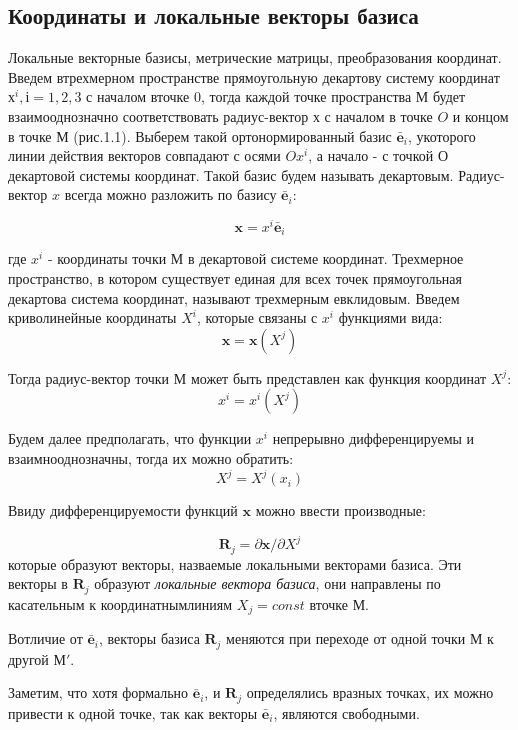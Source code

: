 

\subsection{ Координаты и локальные векторы базиса}
  Локальные векторные базисы, метрические матрицы, преобразования координат.
Введем втрехмерном пространстве прямоугольную декартову систему координат$х^i, і= 1, 2, 3$ с началом вточке 0, тогда каждой точке пространства $М$ будет взаимооднозначно соответствовать радиус-вектор $х$ с началом в точке $O$ и концом в точке $М$ (рис.1.1). Выберем такой ортонормированный базис $\bar{\textbf{e}}_i$, укоторого линии действия векторов совпадают с осями $Ox^i$, а начало - с точкой $О$ декартовой системы координат. Такой базис будем называть декартовым. Радиус-вектор $x$ всегда можно разложить по базису $\bar{\textbf{e}}_i$:

\begin{equation}
    \textbf{x} = x^i\bar{\textbf{e}}_i
\end{equation}\par
где $x^i$ - координаты точки $М$ в декартовой системе координат. Трехмерное пространство, в котором существует единая для всех точек прямоугольная декартова система координат, называют трехмерным евклидовым.
Введем криволинейные координаты $X^i$, которые связаны с $x^i$ функциями вида:
\begin{equation}
    \textbf{x} = \textbf{x}(X^j)
\end{equation}\par
Тогда радиус-вектор точки $М$ может быть представлен как функция координат 
$X^j$:
\begin{equation}
    x^i = x^i(X^j)
\end{equation}\par
Будем далее предполагать, что функции $x^i$ непрерывно дифференцируемы и взаимнооднозначны, тогда их можно обратить:
\begin{equation}
    X^j = X^j(x_i)
\end{equation}\par
Ввиду дифференцируемости функций $\textbf{x}$ можно ввести производные:

\begin{equation}
    \textbf{R}_j = \partial\textbf{x}/\partial X^j
\end{equation}
которые образуют векторы, назваемые локальными векторами базиса. Эти векторы в $\textbf{R}_j$ образуют \textit{локальные вектора базиса}, они направлены по касательным к координатнымлиниям $X_j=const$ вточке $М$.\par
Вотличие от $\bar{\textbf{e}}_i$, векторы базиса $\textbf{R}_j$  меняются при переходе от одной точки $М$ к другой $М'$.\par
Заметим, что хотя формально $\bar{\textbf{e}}_i$, и $\textbf{R}_j$ определялись вразных точках, их можно привести к одной точке, так как векторы $\bar{\textbf{e}}_i$, являются свободными.\par


